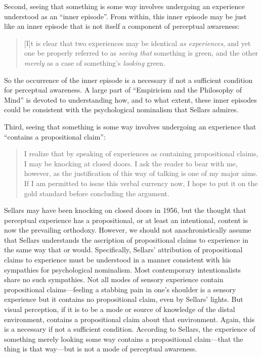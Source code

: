 \documentclass[12pt]{article}
\begin{document}
Second, seeing that something is some way involves undergoing an experience understood as an ``inner episode''. From within, this inner episode may be just like an inner episode that is not itself a component of perceptual awareness:
    \begin{quote}
        [I]t is clear that two experiences may be identical \emph{as experiences}, and yet one be properly referred to as \emph{seeing that} something is green, and the other \emph{merely} as a case of something's \emph{looking} green. \citep[§16]{Sellars:1956xp}
    \end{quote}
    So the occurrence of the inner episode is a necessary if not a sufficient condition for perceptual awareness. A large part of ``Empiricism and the Philosophy of Mind'' is devoted to understanding how, and to what extent, these inner episodes could be consistent with the psychological nominalism that Sellars admires.

Third, seeing that something is some way involves undergoing an experience that ``contains a propositional claim'':
    \begin{quote}
        I realize that by speaking of experiences as containing propositional claims, I may be knocking at closed doors. I ask the reader to bear with me, however, as the justification of this way of talking is one of my major aims. If I am permitted to issue this verbal currency now, I hope to put it on the gold standard before concluding the argument. \citep[§15]{Sellars:1956xp}
    \end{quote}
    Sellars may have been knocking on closed doors in 1956, but the thought that perceptual experience has a propositional, or at least an intentional, content is now the prevailing orthodoxy. However, we should not anachronistically assume that Sellars understands the ascription of propositional claims to experience in the same way that \citet[]{Harman:1990lm} or \citet[]{Tye:2000vn} would. Specifically, Sellars' attribution of propositional claims to experience must be understood in a manner consistent with his sympathies for psychological nominalism. Most contemporary intentionalists share no such sympathies. Not all modes of sensory experience contain propositional claims---feeling a stabbing pain in one's shoulder is a sensory experience but it contains no propositional claim, even by Sellars' lights. But visual perception, if it is to be a mode or source of knowledge of the distal environment, contains a propositional claim about that environment. Again, this is a necessary if not a sufficient condition. According to Sellars, the experience of something merely looking some way contains a propositional claim---that the thing is that way---but is not a mode of perceptual awareness.
\end{document}
